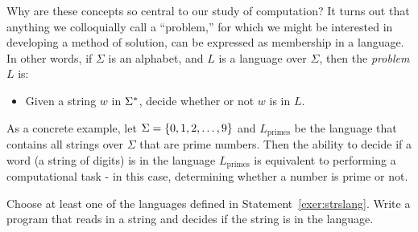 
\begin{discussion}
Why are these concepts so central to our study of computation? It turns out that anything we colloquially call a ``problem,'' for which we might be interested in developing a method of solution, can be expressed as membership in a language. In other words, if $\Sigma$ is an alphabet, and $L$ is a language over $\Sigma$, then the \emph{problem} $L$ is:
\begin{itemize}
\item Given a string $w$ in $\Sigma^{*}$, decide whether or not $w$ is in $L$.
\end{itemize}
As a concrete example, let $\Sigma = \left\lbrace 0, 1, 2, \ldots, 9 \right\rbrace$ and $L_\textrm{primes}$ be the language that contains all strings over $\Sigma$ that are prime numbers. Then the ability to decide if a word (a string of digits) is in the language $L_\textrm{primes}$ is equivalent to performing a computational task - in this case, determining whether a number is prime or not.



\end{discussion}

\begin{progexer}\happymac
Choose at least one of the languages defined in Statement~\ref{exer:strslang}. Write a program that reads in a string and decides if the string is in the language. 
\end{progexer}

